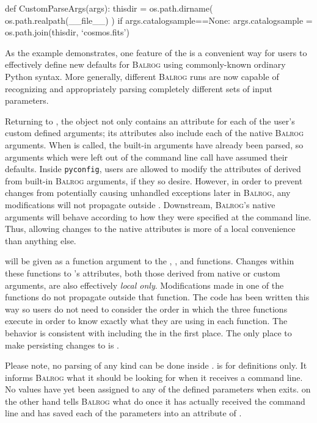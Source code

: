 \documentclass[11pt]{book}
\newcommand{\codett}[1]{\texttt{#1}}
\newcommand{\py}{Python}
\newcommand{\pyconfig}{\codett{pyconfig}}
\newcommand{\balrog}{\textsc{Balrog}}
\begin{document}
\begin{code}
def CustomParseArgs(args):
    thisdir = os.path.dirname( os.path.realpath(__file__) )
    if args.catalogsample==None:
        args.catalogsample = os.path.join(thisdir, `cosmos.fits')
\end{code}

\noindent As the example demonstrates, one feature of the \parsefunc{} is a convenient
way for users to effectively define new defaults for \balrog{} using
commonly-known ordinary \py{} syntax.
More generally, different \balrog{} runs are now capable of recognizing and appropriately parsing
completely different sets of input parameters. 

Returning to \parseargs{},
the object not only contains an attribute for each of the user's custom defined arguments;
its attributes also include each of the native \balrog{} arguments.
When \parsefunc{} is called, the built-in arguments have already been parsed,
so arguments which were left out of the command line call have assumed their defaults.
Inside \pyconfig{}, users are allowed to modify the attributes of \parseargs{} derived from built-in \balrog{} arguments, 
if they so desire.
However, in order to prevent changes from potentially causing unhandled exceptions later in \balrog{},
any modifications will not propagate outside \parsefunc{}.
Downstream, \balrog{}'s native arguments will behave according to how they were specified at the command line.
Thus, allowing changes to the native attributes is more of a local convenience than anything else.

\parseargs{} will be given as a function argument to the \simfunc{}, \gspfunc, and \sexfunc{} functions.
Changes within these functions to \parseargs{}'s attributes, both those derived from native or custom arguments,
are also effectively \emph{local only}.
Modifications made in one of the functions do not propagate outside that function.
The code has been written this way so users do not need to consider the order in which the three functions execute
in order to know exactly what \parseargs{} they are using in each function.
The behavior is consistent with including the \parsefunc{} in the first place.
The only place to make persisting changes to \parseargs{} is \parsefunc{}.

Please note, no parsing of any kind can be done inside \argsfunc{}.
\argsfunc{} is for definitions only.
It informs \balrog{} what it should be looking for when it receives a command line.
No values have yet been assigned to any of the defined parameters when \argsfunc{} exits.
\parsefunc{} on the other hand tells \balrog{} what do once it has actually received the command line
and has saved each of the parameters into an attribute of \parseargs{}.
\end{document}
